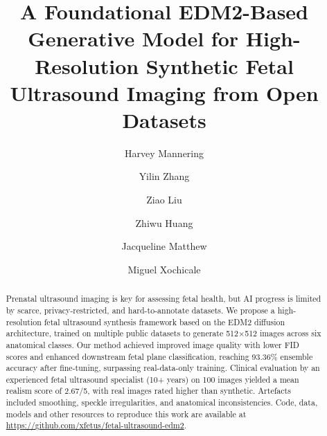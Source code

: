 \documentclass[runningheads]{llncs}
\begin{document}
\title{
A Foundational EDM2-Based Generative Model for High-Resolution Synthetic Fetal Ultrasound Imaging from Open Datasets
}
%
%


%

\author{Harvey Mannering \and
Yilin Zhang  \and
Ziao Liu \and
Zhiwu Huang  \and
Jacqueline Matthew \and
Miguel Xochicale}




\maketitle              %

\vspace{-5mm}
\begin{abstract}
Prenatal ultrasound imaging is key for assessing fetal health, but AI progress is limited by scarce, privacy-restricted, and hard-to-annotate datasets.
We propose a high-resolution fetal ultrasound synthesis framework based on the EDM2 diffusion architecture, trained on multiple public datasets to generate 512×512 images across six anatomical classes. Our method achieved improved image quality with lower FID scores and enhanced downstream fetal plane classification, reaching 93.36\% ensemble accuracy after fine-tuning, surpassing real-data-only training.
Clinical evaluation by an experienced fetal ultrasound specialist (10+ years) on 100 images yielded a mean realism score of 2.67/5, with real images rated higher than synthetic. Artefacts included smoothing, speckle irregularities, and anatomical inconsistencies.
Code, data, models and other resources to reproduce this work are available at \url{https://github.com/xfetus/fetal-ultrasound-edm2}.
\end{abstract}
\end{document}
